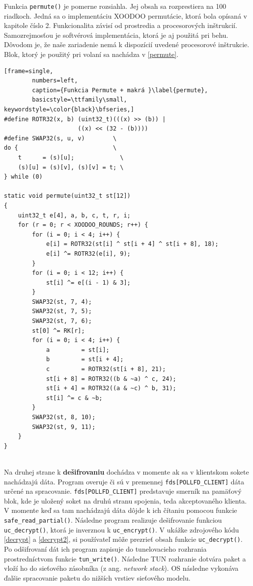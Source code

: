 Funkcia \lstinline|permute()| je pomerne rozsiahla. Jej obsah sa rozprestiera na 100 riadkoch. Jedná sa o implementáciu XOODOO permutácie, ktorá bola opísaná v kapitole číslo 2. Funkcionalita závisí od prostredia a procesorových inštrukcií. Samozrejmosťou je softvérová implementácia, ktorá je aj použitá pri behu. Dôvodom je, že naše zariadenie nemá k dispozícií uvedené procesorové inštrukcie. Blok, ktorý je použitý pri volaní sa nachádza v \ref{permute}.   

\begin{minipage}{\linewidth} 	
	\begin{lstlisting}[frame=single,
		numbers=left,
		caption={Funkcia Permute + makrá }\label{permute},
		basicstyle=\ttfamily\small, keywordstyle=\color{black}\bfseries,]
#define ROTR32(x, b) (uint32_t)(((x) >> (b)) | 
                     ((x) << (32 - (b))))
#define SWAP32(s, u, v)        \
do {                           \
	t      = (s)[u];             \
	(s)[u] = (s)[v], (s)[v] = t; \
} while (0)
	
static void permute(uint32_t st[12])
{
	uint32_t e[4], a, b, c, t, r, i;	
	for (r = 0; r < XOODOO_ROUNDS; r++) {
		for (i = 0; i < 4; i++) {
			e[i] = ROTR32(st[i] ^ st[i + 4] ^ st[i + 8], 18);
			e[i] ^= ROTR32(e[i], 9);
		}
		for (i = 0; i < 12; i++) {
			st[i] ^= e[(i - 1) & 3];
		}
		SWAP32(st, 7, 4);
		SWAP32(st, 7, 5);
		SWAP32(st, 7, 6);
		st[0] ^= RK[r];
		for (i = 0; i < 4; i++) {
			a         = st[i];
			b         = st[i + 4];
			c         = ROTR32(st[i + 8], 21);
			st[i + 8] = ROTR32((b & ~a) ^ c, 24);
			st[i + 4] = ROTR32((a & ~c) ^ b, 31);
			st[i] ^= c & ~b;
		}
		SWAP32(st, 8, 10);
		SWAP32(st, 9, 11);
	}	
}
	\end{lstlisting}
\end{minipage}\\
Na druhej strane k \textbf{dešifrovaniu} dochádza v momente ak sa v klientskom sokete nachádzajú dáta. Program overuje či sú v premennej \lstinline|fds[POLLFD_CLIENT]| dáta určené na spracovanie. \lstinline|fds[POLLFD_CLIENT]| predstavuje smerník na pamäťový blok, kde je uložený soket na druhú stranu spojenia, teda akceptovaného klienta. V momente keď sa tam nachádzajú dáta dôjde k ich čítaniu pomocou funkcie \lstinline|safe_read_partial()|. Následne program realizuje dešifrovanie funkciou \lstinline|uc_decrypt()|, ktorá je inverznou k \lstinline|uc_encrypt()|. V ukážke zdrojového kódu \ref{decrypt} a \ref{decrypt2}, si používateľ môže prezrieť obsah funkcie \lstinline|uc_decrypt()|. Po odšifrovaní dát ich program zapisuje do tunelovacieho rozhrania prostredníctvom funkcie \lstinline|tun_write()|. Následne TUN rozhranie dotvára paket a vloží ho do sieťového zásobníka (z ang. \textit{network stack}). OS následne vykonáva ďalšie spracovanie paketu do nižších vrstiev sieťového modelu. 

